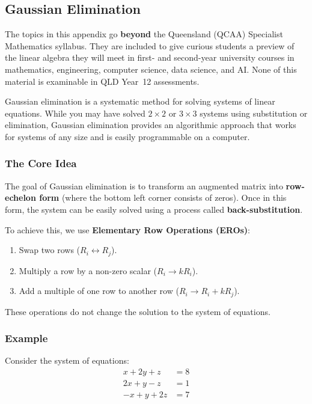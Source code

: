 \subsection{Gaussian Elimination}

\begin{remarkbox}[title={\bfseries Enrichment Material}]
The topics in this appendix go \textbf{beyond} the Queensland (QCAA) Specialist Mathematics syllabus. They are included to give curious students a preview of the linear algebra they will meet in first- and second-year university courses in mathematics, engineering, computer science, data science, and AI. None of this material is examinable in QLD Year~12 assessments.
\end{remarkbox}

Gaussian elimination is a systematic method for solving systems of linear equations. While you may have solved $2 \times 2$ or $3 \times 3$ systems using substitution or elimination, Gaussian elimination provides an algorithmic approach that works for systems of any size and is easily programmable on a computer.

\subsubsection*{The Core Idea}

The goal of Gaussian elimination is to transform an augmented matrix into \textbf{row-echelon form} (where the bottom left corner consists of zeros). Once in this form, the system can be easily solved using a process called \textbf{back-substitution}.

To achieve this, we use \textbf{Elementary Row Operations (EROs)}:
\begin{enumerate}
    \item Swap two rows ($R_i \leftrightarrow R_j$).
    \item Multiply a row by a non-zero scalar ($R_i \to kR_i$).
    \item Add a multiple of one row to another row ($R_i \to R_i + kR_j$).
\end{enumerate}
These operations do not change the solution to the system of equations.

\subsubsection*{Example}

Consider the system of equations:
\begin{align*}
    x + 2y + z &= 8 \\
    2x + y - z &= 1 \\
    -x + y + 2z &= 7
\end{align*}

